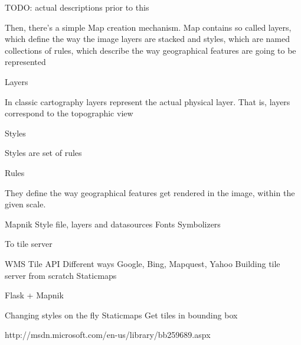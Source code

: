 \documentclass{beamer}
\begin{document}
TODO: actual descriptions prior to this

Then, there's a simple Map creation mechanism. Map contains so called layers,
which define the way the image layers are stacked and styles, which are named
collections of rules, which describe the way geographical features are going
to be represented

Layers

In classic cartography layers represent the actual physical layer. That is,
layers correspond to the topographic view

Styles

Styles are set of rules

Rules

They define the way geographical features get rendered in the image, within
the given scale.




Mapnik
Style file, layers and datasources
Fonts
Symbolizers

To tile server

WMS
Tile API
Different ways
Google, Bing, Mapquest, Yahoo
Building tile server from scratch
Staticmaps

Flask + Mapnik

Changing styles on the fly
Staticmaps
Get tiles in bounding box


http://msdn.microsoft.com/en-us/library/bb259689.aspx
\end{document}
